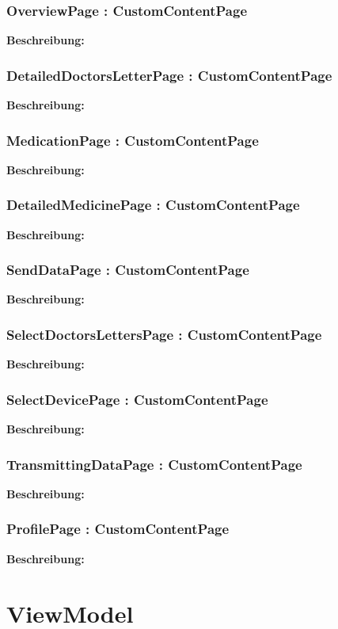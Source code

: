 \documentclass[a4paper]{scrreprt}
\begin{document}
\subsubsection{OverviewPage : CustomContentPage}
\textbf{Beschreibung:}

\subsubsection{DetailedDoctorsLetterPage : CustomContentPage}
\textbf{Beschreibung:}

\subsubsection{MedicationPage : CustomContentPage}
\textbf{Beschreibung:}

\subsubsection{DetailedMedicinePage : CustomContentPage}
\textbf{Beschreibung:}

\subsubsection{SendDataPage : CustomContentPage}
\textbf{Beschreibung:}

\subsubsection{SelectDoctorsLettersPage : CustomContentPage}
\textbf{Beschreibung:}

\subsubsection{SelectDevicePage : CustomContentPage}
\textbf{Beschreibung:}

\subsubsection{TransmittingDataPage : CustomContentPage}
\textbf{Beschreibung:}

\subsubsection{ProfilePage : CustomContentPage}
\textbf{Beschreibung:}


\section{ViewModel}
\end{document}
